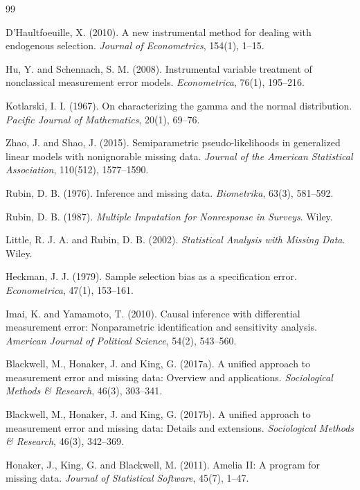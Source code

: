 \documentclass[dvipdfmx,autodetect-engine]{jsarticle}
\newcommand{\1}{\mathbf{1}}
\begin{document}
\begin{thebibliography}{99}

D'Haultfoeuille, X. (2010).
A new instrumental method for dealing with endogenous selection.
\textit{Journal of Econometrics}, 154(1), 1--15.

Hu, Y. and Schennach, S. M. (2008).
Instrumental variable treatment of nonclassical measurement error models.
\textit{Econometrica}, 76(1), 195--216.

Kotlarski, I. I. (1967).
On characterizing the gamma and the normal distribution.
\textit{Pacific Journal of Mathematics}, 20(1), 69--76.

Zhao, J. and Shao, J. (2015).
Semiparametric pseudo-likelihoods in generalized linear models with nonignorable missing data.
\textit{Journal of the American Statistical Association}, 110(512), 1577--1590.


Rubin, D. B. (1976).
Inference and missing data.
\textit{Biometrika}, 63(3), 581--592.

Rubin, D. B. (1987).
\textit{Multiple Imputation for Nonresponse in Surveys}.
Wiley.

Little, R. J. A. and Rubin, D. B. (2002).
\textit{Statistical Analysis with Missing Data}.
Wiley.

Heckman, J. J. (1979).
Sample selection bias as a specification error.
\textit{Econometrica}, 47(1), 153--161.

Imai, K. and Yamamoto, T. (2010).
Causal inference with differential measurement error: Nonparametric identification and sensitivity analysis.
\textit{American Journal of Political Science}, 54(2), 543--560.

Blackwell, M., Honaker, J. and King, G. (2017a).
A unified approach to measurement error and missing data: Overview and applications.
\textit{Sociological Methods \& Research}, 46(3), 303--341.

Blackwell, M., Honaker, J. and King, G. (2017b).
A unified approach to measurement error and missing data: Details and extensions.
\textit{Sociological Methods \& Research}, 46(3), 342--369.

Honaker, J., King, G. and Blackwell, M. (2011).
Amelia II: A program for missing data.
\textit{Journal of Statistical Software}, 45(7), 1--47.


\end{thebibliography}
\end{document}

